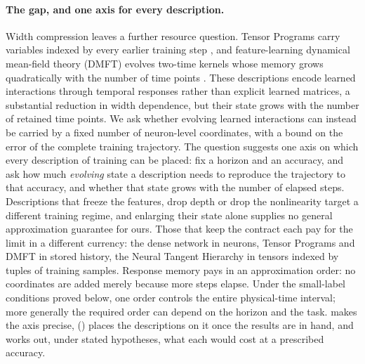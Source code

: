 \documentclass[11pt]{article}
\theoremstyle{definition}
\theoremstyle{remark}
\begin{document}
\paragraph{The gap, and one axis for every description.}
Width compression leaves a further resource question.  Tensor Programs
carry variables indexed by every earlier training step \citep{yang2021tensor},
and feature-learning dynamical mean-field theory (DMFT) evolves two-time kernels
whose memory grows quadratically with the number of time points
\citep{bordelon2022dmft}.  These descriptions encode learned interactions
through temporal responses rather than explicit learned matrices, a
substantial reduction in width dependence, but their state grows with the
number of retained time points.  We ask whether evolving learned interactions
can instead be carried by a fixed number of neuron-level coordinates, with a
bound on the error of the complete training trajectory.  The question suggests
one axis on which every description of training can be placed: fix a horizon
and an accuracy, and ask how much \emph{evolving} state a description needs to
reproduce the trajectory to that accuracy, and whether that state grows with
the number of elapsed steps.  Descriptions that freeze the features, drop depth
or drop the nonlinearity target a different training regime, and enlarging
their state alone supplies no general approximation guarantee for ours.  Those
that keep the contract each pay for the limit in a different currency: the
dense network in neurons, Tensor Programs and DMFT in stored history, the Neural
Tangent Hierarchy in tensors indexed by tuples of training samples.  Response
memory pays in an approximation order: no coordinates are added merely
because more steps elapse.  Under the small-label conditions proved below,
one order controls the entire physical-time interval; more generally the
required order can depend on the horizon and the task.   makes
the axis precise,  () places the descriptions
on it once the results are in hand, and  works out, under stated
hypotheses, what each would cost at a prescribed accuracy.
\end{document}
